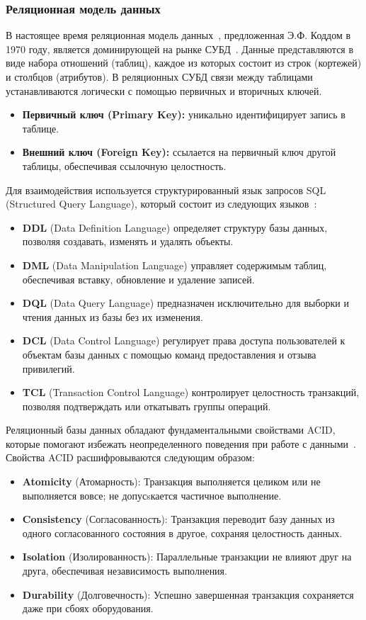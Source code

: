 \subsubsection{Реляционная модель данных}
В настоящее время реляционная модель данных~\cite{relation-db}, предложенная Э.Ф. Коддом в 1970 году, является доминирующей на рынке СУБД~\cite{relation-bd-research}.
Данные представляются в виде набора отношений (таблиц), каждое из которых состоит из строк (кортежей) и столбцов (атрибутов).
В реляционных СУБД связи между таблицами устанавливаются логически с помощью первичных и вторичных ключей.
\begin{itemize}
\item \textbf{Первичный ключ (Primary Key):} уникально идентифицирует запись в таблице.
\item \textbf{Внешний ключ (Foreign Key):} ссылается на первичный ключ другой таблицы, обеспечивая ссылочную целостность.
\end{itemize}

Для взаимодействия используется структурированный язык запросов SQL (Structured Query Language),
который состоит из следующих языков~\cite{sql-lang}:
\begin{itemize}
    \item \textbf{DDL} (Data Definition Language) определяет структуру базы данных, позволяя создавать, изменять и удалять объекты.
    \item \textbf{DML} (Data Manipulation Language) управляет содержимым таблиц, обеспечивая вставку, обновление и удаление записей.
    \item \textbf{DQL} (Data Query Language) предназначен исключительно для выборки и чтения данных из базы без их изменения.
    \item \textbf{DCL} (Data Control Language) регулирует права доступа пользователей к объектам базы данных с помощью команд предоставления и отзыва привилегий.
    \item \textbf{TCL} (Transaction Control Language) контролирует целостность транзакций, позволяя подтверждать или откатывать группы операций.
\end{itemize}
Реляционный базы данных обладают фундаментальными свойствами ACID, которые помогают избежать неопределенного поведения при работе с данными~\cite{acid}.
Свойства ACID расшифровываются следующим образом:
\begin{itemize}
    \item \textbf{Atomicity} (Атомарность): Транзакция выполняется целиком или не выполняется вовсе; не допусsкается частичное выполнение.
    \item \textbf{Consistency} (Согласованность): Транзакция переводит базу данных из одного согласованного состояния в другое, сохраняя целостность данных.
    \item \textbf{Isolation} (Изолированность): Параллельные транзакции не влияют друг на друга, обеспечивая независимость выполнения.
    \item \textbf{Durability} (Долговечность): Успешно завершенная транзакция сохраняется даже при сбоях оборудования. 
\end{itemize}

